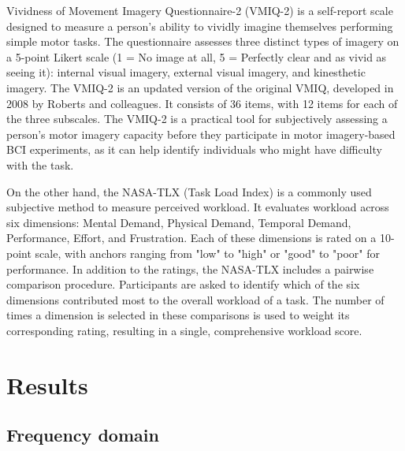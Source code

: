 \documentclass[10pt,letterpaper]{article}
\begin{document}
Vividness of Movement Imagery Questionnaire-2 (VMIQ-2) is a self-report scale designed to measure a person's ability to vividly imagine themselves performing simple motor tasks. The questionnaire assesses three distinct types of imagery on a 5-point Likert scale (1 = No image at all, 5 = Perfectly clear and as vivid as seeing it): internal visual imagery, external visual imagery, and kinesthetic imagery. The VMIQ-2 is an updated version of the original VMIQ, developed in 2008 by Roberts and colleagues. It consists of 36 items, with 12 items for each of the three subscales.
The VMIQ-2 is a practical tool for subjectively assessing a person's motor imagery capacity before they participate in motor imagery-based BCI experiments, as it can help identify individuals who might have difficulty with the task.

On the other hand, the NASA-TLX (Task Load Index) is a commonly used subjective method to measure perceived workload. It evaluates workload across six dimensions: Mental Demand, Physical Demand, Temporal Demand, Performance, Effort, and Frustration. Each of these dimensions is rated on a 10-point scale, with anchors ranging from "low" to "high" or "good" to "poor" for performance. In addition to the ratings, the NASA-TLX includes a pairwise comparison procedure. Participants are asked to identify which of the six dimensions contributed most to the overall workload of a task. The number of times a dimension is selected in these comparisons is used to weight its corresponding rating, resulting in a single, comprehensive workload score. 



\section*{Results}

\subsection*{Frequency domain}
\end{document}
